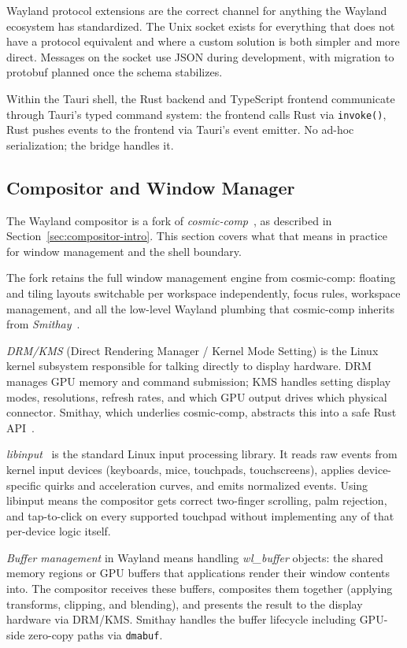 Wayland protocol extensions are the correct channel for anything the Wayland
ecosystem has standardized. The Unix socket exists for everything that does not
have a protocol equivalent and where a custom solution is both simpler and more
direct. Messages on the socket use JSON during development, with migration to
protobuf planned once the schema stabilizes.

Within the Tauri shell, the Rust backend and TypeScript frontend communicate
through Tauri's typed command system: the frontend calls Rust via
\texttt{invoke()}, Rust pushes events to the frontend via Tauri's event
emitter. No ad-hoc serialization; the bridge handles it.

\subsection{Compositor and Window Manager}
\label{sec:compositor}

The Wayland compositor is a fork of \emph{cosmic-comp}~\cite{cosmic:comp},
as described in Section~\ref{sec:compositor-intro}. This section covers what
that means in practice for window management and the shell boundary.

The fork retains the full window management engine from cosmic-comp: floating
and tiling layouts switchable per workspace independently, focus rules,
workspace management, and all the low-level Wayland plumbing that cosmic-comp
inherits from \emph{Smithay}~\cite{smithay}.

\emph{DRM/KMS} (Direct Rendering Manager / Kernel Mode Setting) is the Linux
kernel subsystem responsible for talking directly to display hardware. DRM
manages GPU memory and command submission; KMS handles setting display modes,
resolutions, refresh rates, and which GPU output drives which physical
connector. Smithay, which underlies cosmic-comp, abstracts this into a safe
Rust API~\cite{archwiki:drm}.

\emph{libinput}~\cite{libinput} is the standard Linux input processing library.
It reads raw events from kernel input devices (keyboards, mice, touchpads,
touchscreens), applies device-specific quirks and acceleration curves, and
emits normalized events. Using libinput means the compositor gets correct
two-finger scrolling, palm rejection, and tap-to-click on every supported
touchpad without implementing any of that per-device logic itself.

\emph{Buffer management} in Wayland means handling \emph{wl\_buffer} objects:
the shared memory regions or GPU buffers that applications render their window
contents into. The compositor receives these buffers, composites them together
(applying transforms, clipping, and blending), and presents the result to the
display hardware via DRM/KMS. Smithay handles the buffer lifecycle including
GPU-side zero-copy paths via \texttt{dmabuf}.

